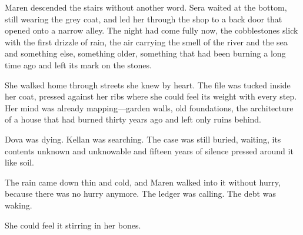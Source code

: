 \documentclass[12pt,letterpaper,openany]{book}
\begin{document}
Maren descended the stairs without another word. Sera waited at the bottom, still wearing the grey coat, and led her through the shop to a back door that opened onto a narrow alley. The night had come fully now, the cobblestones slick with the first drizzle of rain, the air carrying the smell of the river and the sea and something else, something older, something that had been burning a long time ago and left its mark on the stones.
\par
She walked home through streets she knew by heart. The file was tucked inside her coat, pressed against her ribs where she could feel its weight with every step. Her mind was already mapping—garden walls, old foundations, the architecture of a house that had burned thirty years ago and left only ruins behind.
\par
Dova was dying. Kellan was searching. The case was still buried, waiting, its contents unknown and unknowable and fifteen years of silence pressed around it like soil.
\par
The rain came down thin and cold, and Maren walked into it without hurry, because there was no hurry anymore. The ledger was calling. The debt was waking.
\par
She could feel it stirring in her bones.
\par
\end{document}
